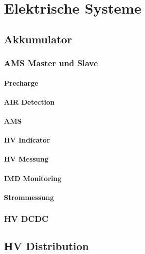 
\chapter{Elektrische Systeme}
\section{Akkumulator}

\subsection{AMS Master und Slave}

\subsubsection{Precharge}

\subsubsection{AIR Detection}

\subsubsection{AMS}

\subsubsection{HV Indicator}

\subsubsection{HV Messung}

\subsubsection{IMD Monitoring}

\subsubsection{Strommessung}

\subsection{HV DCDC}

\section{HV Distribution}

